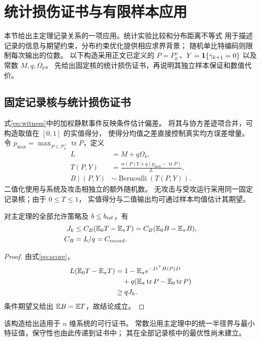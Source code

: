 \section{统计损伤证书与有限样本应用}
\label{app:statistical}
本节给出主定理记录关系的一项应用。统计实验比较\cite{blackwell1953}和分布距离不等式\cite{sason2016}
用于描述记录的信息与期望约束，分布约束优化\cite{bertsimas2005}提供相应求界背景；
随机单比特编码\cite{benbasat2021,suresh2017}则限制每次输出的位数。
以下构造采用正文已定义的 $P=P_k^+$、$Y=\mathbf 1\{\gamma_{k+1}=0\}$ 以及常数 $M,q,\Omega_k$。
先给出固定核的统计损伤证书，再说明其独立样本保证和数值代价。
\subsection{固定记录核与统计损伤证书}
式\eqref{eq:witness}中的加权静默事件反映条件估计偏差。
将其与协方差迹项合并，可构造取值在 $[0,1]$ 的实值得分，
使得分均值之差直接控制真实均方误差增量。
令 $p_{\max}=\max_{P\in\mathcal P_k^+}\operatorname{tr}P$，定义
\begin{equation}
 \begin{aligned}
 L&=M+q\Omega_k,\\
 T(P,Y)&=\frac{w(P)Y+q(p_{\max}-\operatorname{tr}P)}{L},\\
 B\mid(P,Y)&\sim\operatorname{Bernoulli}(T(P,Y)).
 \end{aligned}
 \label{eq:score}
\end{equation}
二值化使用与系统及攻击相独立的额外随机数。
无攻击与受攻运行采用同一固定记录核；由于 $0\le T\le1$，
实值得分与二值输出均可通过样本均值估计其期望。
\begin{proposition}[向量系统的统计损伤证书]
\label{prop:certificate}
对主定理的全部允许策略及 $b\le b_{\rm ref}$，有
\begin{equation}
 \begin{aligned}
 J_k&\le C_B(\mathbb E_0T-\mathbb E_\pi T)
       =C_B(\mathbb E_0B-\mathbb E_\pi B),\\
 C_B&=L/q=C_{\rm record}.
 \end{aligned}
 \label{eq:signed-certificate}
\end{equation}
\end{proposition}
\begin{proof}
由式\eqref{eq:score}，
\begin{equation}
 \begin{aligned}
 L(\mathbb E_0T-\mathbb E_\pi T)
 &=1-\mathbb E_\pi e^{-D^\top H(P)D}\\
 &\quad+q(\mathbb E_\pi\operatorname{tr}P-\mathbb E_0\operatorname{tr}P)\\
 &\ge qJ_k.
 \end{aligned}
 \label{eq:score-identity}
\end{equation}
条件期望又给出 $\mathbb E B=\mathbb E T$，故结论成立。
\end{proof}
该构造给出适用于 $n$ 维系统的可行证书。
常数沿用主定理中的统一半径界与最小特征值，保守性也由此传递到证书中；
其在全部记录核中的最优性尚未建立。

